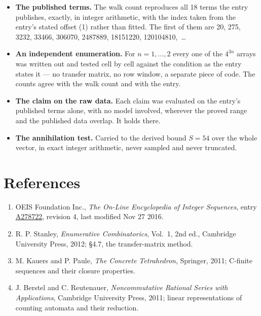 \documentclass[11pt]{article}
\theoremstyle{definition}
\begin{document}
\begin{itemize}

\item {\bfseries The published terms.} The walk count reproduces all 18 terms the entry publishes, exactly, in integer arithmetic, with the index taken from the entry's stated offset (1) rather than fitted. The first of them are 20, 275, 3232, 33466, 306070, 2487889, 18151220, 120104810,~\dots

\item {\bfseries An independent enumeration.} For $n = 1,\dots,2$ every one of the $4^{3n}$ arrays was written out and tested cell by cell against the condition as the entry states it --- no transfer matrix, no row window, a separate piece of code. The counts agree with the walk count and with the entry.

\item {\bfseries The claim on the raw data.} Each claim was evaluated on the entry's published terms alone, with no model involved, wherever the proved range and the published data overlap. It holds there.

\item {\bfseries The annihilation test.} Carried to the derived bound $S = 54$ over the whole vector, in exact integer arithmetic, never sampled and never truncated.

\end{itemize}

\section{References}

\begin{enumerate}

\item OEIS Foundation Inc., \emph{The On-Line Encyclopedia of Integer Sequences}, entry \href{https://oeis.org/A278722}{A278722}, revision 4, last modified Nov 27 2016.

\item R. P. Stanley, \emph{Enumerative Combinatorics}, Vol.~1, 2nd ed., Cambridge University Press, 2012; \S4.7, the transfer-matrix method.

\item M. Kauers and P. Paule, \emph{The Concrete Tetrahedron}, Springer, 2011; C-finite sequences and their closure properties.

\item J. Berstel and C. Reutenauer, \emph{Noncommutative Rational Series with Applications}, Cambridge University Press, 2011; linear representations of counting automata and their reduction.

\end{enumerate}
\end{document}
